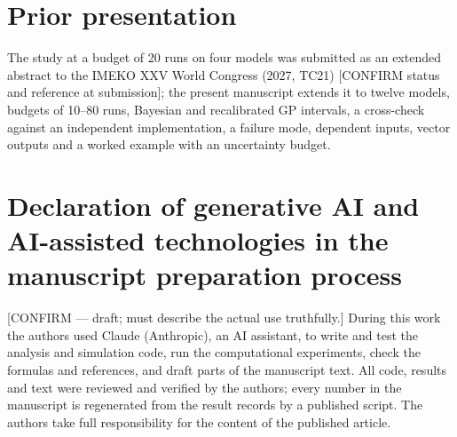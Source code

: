 \documentclass[11pt,a4paper]{article}
\begin{document}
\section*{Prior presentation}
The study at a budget of 20 runs on four models was submitted as an
extended abstract to the IMEKO XXV World Congress (2027, TC21) [CONFIRM
status and reference at submission]; the present manuscript extends it to
twelve models, budgets of 10--80 runs, Bayesian and recalibrated GP
intervals, a cross-check against an independent implementation, a failure
mode, dependent inputs, vector outputs and a worked example with an
uncertainty budget.

\section*{Declaration of generative AI and AI-assisted technologies in the
manuscript preparation process}
[CONFIRM — draft; must describe the actual use truthfully.] During this
work the authors used Claude (Anthropic), an AI assistant, to write and
test the analysis and simulation code, run the computational experiments,
check the formulas and references, and draft parts of the manuscript text.
All code, results and text were reviewed and verified by the authors; every
number in the manuscript is regenerated from the result records by a
published script. The authors take full responsibility for the content of
the published article.
\end{document}
